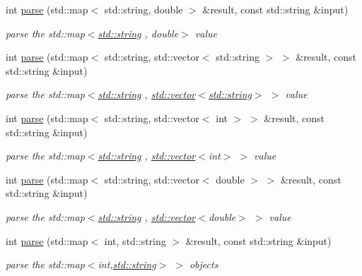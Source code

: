 \begin{DoxyCompactItemize}
int \hyperlink{namespace_d_d4hep_1_1_parsers_a3bb4178f3175f409b144ff5629463c14}{parse} (std::map$<$ std::string, double $>$ \&result, const std::string \&input)
\begin{DoxyCompactList}\small\item\em parse the {\ttfamily std::map$<$\hyperlink{classstd_1_1string}{std::string} , double$>$} value \item\end{DoxyCompactList}\item 
int \hyperlink{namespace_d_d4hep_1_1_parsers_a010112afc7cbf060b08876d5d4dee7d5}{parse} (std::map$<$ std::string, std::vector$<$ std::string $>$ $>$ \&result, const std::string \&input)
\begin{DoxyCompactList}\small\item\em parse the {\ttfamily std::map$<$\hyperlink{classstd_1_1string}{std::string} , \hyperlink{classstd_1_1vector}{std::vector}$<$\hyperlink{classstd_1_1string}{std::string}$>$ $>$} value \item\end{DoxyCompactList}\item 
int \hyperlink{namespace_d_d4hep_1_1_parsers_a0da3b1bf74df4603de3860725652b1f7}{parse} (std::map$<$ std::string, std::vector$<$ int $>$ $>$ \&result, const std::string \&input)
\begin{DoxyCompactList}\small\item\em parse the {\ttfamily std::map$<$\hyperlink{classstd_1_1string}{std::string} , \hyperlink{classstd_1_1vector}{std::vector}$<$int$>$ $>$} value \item\end{DoxyCompactList}\item 
int \hyperlink{namespace_d_d4hep_1_1_parsers_a117aacde08a7caa18db156f5871ad9cf}{parse} (std::map$<$ std::string, std::vector$<$ double $>$ $>$ \&result, const std::string \&input)
\begin{DoxyCompactList}\small\item\em parse the {\ttfamily std::map$<$\hyperlink{classstd_1_1string}{std::string} , \hyperlink{classstd_1_1vector}{std::vector}$<$double$>$ $>$} value \item\end{DoxyCompactList}\item 
int \hyperlink{namespace_d_d4hep_1_1_parsers_a3d922ac85001241814312a94a6ccdbc3}{parse} (std::map$<$ int, std::string $>$ \&result, const std::string \&input)
\begin{DoxyCompactList}\small\item\em parse the {\ttfamily std::map$<$int,\hyperlink{classstd_1_1string}{std::string}$>$ $>$} objects \item\end{DoxyCompactList}\item 

\end{DoxyCompactItemize}
